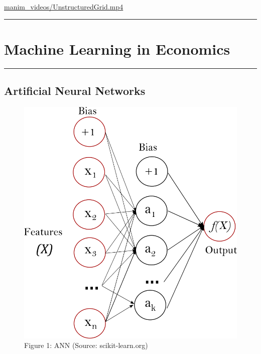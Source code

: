 \documentclass[
  letterpaper,
  DIV=11,
  numbers=noendperiod]{scrartcl}
\begin{document}
\url{manim_videos/UnstructuredGrid.mp4}

\begin{center}\rule{0.5\linewidth}{0.5pt}\end{center}

\hypertarget{machine-learning-in-economics}{%
\section{Machine Learning in
Economics}\label{machine-learning-in-economics}}

\begin{center}\rule{0.5\linewidth}{0.5pt}\end{center}

\hypertarget{artificial-neural-networks}{%
\subsection{Artificial Neural
Networks}\label{artificial-neural-networks}}

\begin{figure}

{\centering \includegraphics{multilayerperceptron_network.png}

}

\caption{Figure 1: ANN (Source: scikit-learn.org)}

\end{figure}
\end{document}

